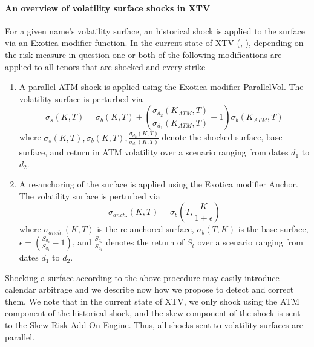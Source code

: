 \documentclass[11pt,letterpaper]{article}
\begin{document}
\paragraph{An overview of volatility surface shocks in XTV} 
For a given name's volatility surface, an historical shock is applied to the surface via an Exotica modifier function. In the current state of XTV (\cite{xtv}, \cite{rmsr_xtv}), depending on the risk measure in question one or both of the following modifications are applied to all tenors that are shocked and every strike 
\begin{enumerate}
\item A parallel ATM shock is applied using the Exotica modifier ParallelVol. The volatility surface is perturbed via
\[
\sigma_{s}(K,T) = \sigma_b(K,T) + \left( \frac{ \sigma_{d_2}(K_{ATM},T)}{\sigma_{d_1}(K_{ATM},T)} -1\right) \sigma_{b}(K_{ATM},T)
\]
where $\sigma_s(K,T), \sigma_{b}(K,T), \frac{ \sigma_{d_2}(K,T)}{\sigma_{d_1}(K,T)} $ denote the shocked surface, base surface, and return in ATM volatility over a scenario ranging from dates $d_1$ to $d_2$. 
\item A re-anchoring of the surface is applied using the Exotica modifier Anchor. The volatility surface is perturbed via
\[
\sigma_{anch.}(K,T) = \sigma_b(T,\frac{K}{1 + \epsilon})
\]
where $\sigma_{anch.}(K,T)$ is the re-anchored surface, $\sigma_b(T,K)$ is the base surface, $\epsilon = \left( \frac{S_{d_2}}{S_{d_1}} - 1\right)$, and $\frac{S_{d_2}}{S_{d_1}}$ denotes the return of $S_t$ over a scenario ranging from dates $d_1$ to $d_2$. 
\end{enumerate}
Shocking a surface according to the above procedure may easily introduce calendar arbitrage and we describe now how we propose to detect and correct them. We note that in the current state of XTV, we only shock using the ATM component of the historical shock, and the skew component of the shock is sent to the Skew Risk Add-On Engine. Thus, all shocks sent to volatility surfaces are parallel. 
\end{document}
